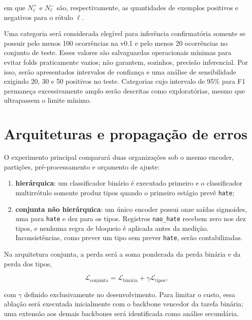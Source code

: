 em que $N_{\ell}^{+}$ e $N_{\ell}^{-}$ são, respectivamente, as quantidades de
exemplos positivos e negativos para o rótulo $\ell$.

Uma categoria será considerada elegível para inferência confirmatória somente
se possuir pelo menos 100 ocorrências na v0.1 e pelo menos 20 ocorrências no
conjunto de teste. Esses valores são salvaguardas operacionais mínimas para
evitar folds praticamente vazios; não garantem, sozinhos, precisão inferencial.
Por isso, serão apresentados intervalos de confiança e uma análise de
sensibilidade exigindo 20, 30 e 50 positivos no teste. Categorias cujo intervalo
de 95\% para F1 permaneça excessivamente amplo serão descritas como exploratórias,
mesmo que ultrapassem o limite mínimo.

\section{Arquiteturas e propagação de erros}
\label{sec:arquiteturas}

O experimento principal comparará duas organizações sob o mesmo encoder,
partições, pré-processamento e orçamento de ajuste:

\begin{enumerate}
    \item \textbf{hierárquica}: um classificador binário é executado primeiro e
    o classificador multirrótulo somente produz tipos quando o primeiro estágio
    prevê \texttt{hate};
    \item \textbf{conjunta não hierárquica}: um único encoder possui onze saídas
    sigmoides, uma para \texttt{hate} e dez para os tipos. Registros
    \texttt{nao\_hate} recebem zero nos dez tipos, e nenhuma regra de bloqueio é
    aplicada antes da medição. Inconsistências, como prever um tipo sem prever
    \texttt{hate}, serão contabilizadas.
\end{enumerate}

Na arquitetura conjunta, a perda será a soma ponderada da perda binária e da
perda dos tipos,

\begin{equation}
    \mathcal{L}_{\mathrm{conjunta}} =
    \mathcal{L}_{\mathrm{binária}} +
    \gamma\mathcal{L}_{\mathrm{tipos}},
\end{equation}

com $\gamma$ definido exclusivamente no desenvolvimento. Para limitar o custo,
essa ablação será executada inicialmente com o backbone vencedor da tarefa
binária; uma extensão aos demais backbones será identificada como análise
secundária.

